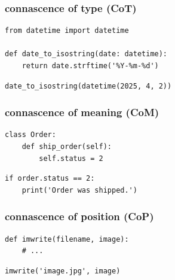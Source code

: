 \documentclass[aspectratio=169,12pt,xcolor=dvipsnames]{beamer}
\begin{document}
\begin{frame}[fragile]
  \frametitle{connascence of type (CoT)}
  \begin{center}
    \begin{minipage}[c]{.65\textwidth}
      \begin{verbatim}
from datetime import datetime

def date_to_isostring(date: datetime):
    return date.strftime('%Y-%m-%d')
      \end{verbatim}
    \end{minipage}
    \begin{minipage}[c]{.65\textwidth}
      \begin{verbatim}
date_to_isostring(datetime(2025, 4, 2))
      \end{verbatim}
    \end{minipage}
  \end{center}
\end{frame}

\begin{frame}[fragile]
  \frametitle{connascence of meaning (CoM)}
  \begin{center}
    \begin{minipage}[c]{.5\textwidth}
      \begin{verbatim}
class Order:
    def ship_order(self):
        self.status = 2
      \end{verbatim}
    \end{minipage}
    \begin{minipage}[c]{.5\textwidth}
      \begin{verbatim}
if order.status == 2:
    print('Order was shipped.')
      \end{verbatim}
    \end{minipage}
  \end{center}
\end{frame}

\begin{frame}[fragile]
  \frametitle{connascence of position (CoP)}
  \begin{center}
    \begin{minipage}[c]{.5\textwidth}
      \begin{verbatim}
def imwrite(filename, image):
    # ...
      \end{verbatim}
    \end{minipage}
    \begin{minipage}[c]{.5\textwidth}
      \begin{verbatim}
imwrite('image.jpg', image)
      \end{verbatim}
    \end{minipage}
  \end{center}
\end{frame}
\end{document}
